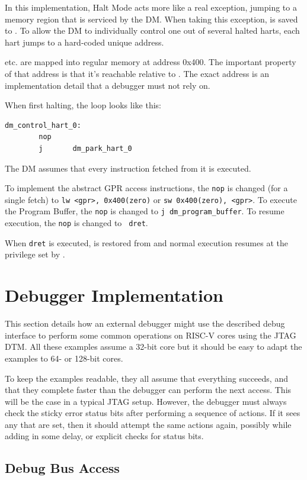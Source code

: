 \documentclass{article}
\begin{document}
In this implementation, Halt Mode acts more like a real exception, jumping to a
memory region that is serviced by the DM. When taking this exception, \Rpc is
saved to \Rdpc. To allow the DM to individually control one out of several
halted harts, each hart jumps to a hard-coded unique address.

\Rdatazero etc. are mapped into regular memory at address 0x400. The important
property of that address is that it's reachable relative to \Rzero. The exact
address is an implementation detail that a debugger must not rely on.

When first halting, the loop looks like this:
\begin{verbatim}
dm_control_hart_0:
        nop
        j       dm_park_hart_0
\end{verbatim}

The DM assumes that every instruction fetched from it is executed.

To implement the abstract GPR access instructions, the {\tt nop} is changed
(for a single fetch) to {\tt lw <gpr>, 0x400(zero)} or {\tt sw 0x400(zero),
<gpr>}. To execute the Program Buffer, the {\tt nop} is changed to {\tt j
dm\_program\_buffer}. To resume execution, the {\tt nop} is changed to {\tt
dret}.

When {\tt dret} is executed, \Rpc is restored from \Rdpc and normal execution
resumes at the privilege set by \Fprv.

\section{Debugger Implementation}

This section details how an external debugger might use the described debug
interface to perform some common operations on RISC-V cores using the JTAG DTM.
All these examples assume a 32-bit core but it should be easy to adapt the
examples to 64- or 128-bit cores.

To keep the examples readable, they all assume that everything succeeds, and
that they complete faster than the debugger can perform the next access. This
will be the case in a typical JTAG setup. However, the debugger must always
check the sticky error status bits after performing a sequence of actions. If
it sees any that are set, then it should attempt the same actions again,
possibly while adding in some delay, or explicit checks for status bits.

\subsection{Debug Bus Access} \label{dbusaccess}
\end{document}
